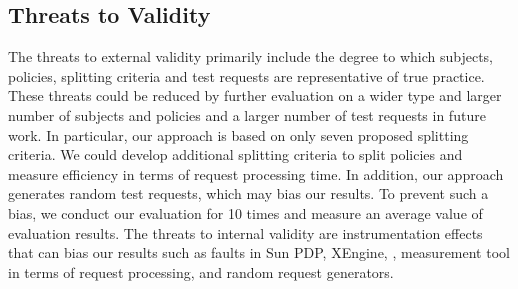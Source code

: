\subsection{Threats to Validity}
The threats to external validity primarily include the degree to which subjects, policies, splitting criteria and test requests are representative 
of true practice. These threats could be reduced by further evaluation on a wider type and larger number of subjects and policies and a larger number of 
test requests in future work. In particular, our approach is based on only seven proposed splitting criteria.  We could develop additional 
splitting criteria to split policies and measure efficiency in terms of request processing time. In addition, our approach generates random test requests, 
which may bias our results. To prevent such a bias, we conduct our evaluation for 10 times and measure an average value of evaluation results. 
The threats to internal validity are instrumentation effects that can bias our results such as faults in Sun PDP, XEngine, , 
measurement tool in terms of request processing, and random request generators.
